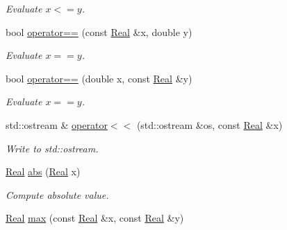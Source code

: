 \begin{DoxyCompactItemize}
\begin{DoxyCompactList}\small\item\em Evaluate $ x<=y $. \end{DoxyCompactList}\item 
\hypertarget{namespaceSpacy_aef4930427aac4c8089b4c43b1c97cf25}{}bool \hyperlink{namespaceSpacy_aef4930427aac4c8089b4c43b1c97cf25}{operator==} (const \hyperlink{classSpacy_1_1Real}{Real} \&x, double y)\label{namespaceSpacy_aef4930427aac4c8089b4c43b1c97cf25}

\begin{DoxyCompactList}\small\item\em Evaluate $ x==y $. \end{DoxyCompactList}\item 
\hypertarget{namespaceSpacy_a4703102a4db1dbffcce1cc5bd484a57c}{}bool \hyperlink{namespaceSpacy_a4703102a4db1dbffcce1cc5bd484a57c}{operator==} (double x, const \hyperlink{classSpacy_1_1Real}{Real} \&y)\label{namespaceSpacy_a4703102a4db1dbffcce1cc5bd484a57c}

\begin{DoxyCompactList}\small\item\em Evaluate $ x==y $. \end{DoxyCompactList}\item 
\hypertarget{namespaceSpacy_ace1cc9f68970644f58a760f77936a062}{}std\+::ostream \& \hyperlink{namespaceSpacy_ace1cc9f68970644f58a760f77936a062}{operator$<$$<$} (std\+::ostream \&os, const \hyperlink{classSpacy_1_1Real}{Real} \&x)\label{namespaceSpacy_ace1cc9f68970644f58a760f77936a062}

\begin{DoxyCompactList}\small\item\em Write to std\+::ostream. \end{DoxyCompactList}\item 
\hypertarget{namespaceSpacy_a89ed08f6f5a05e3f35afa37fcebf4b06}{}\hyperlink{classSpacy_1_1Real}{Real} \hyperlink{namespaceSpacy_a89ed08f6f5a05e3f35afa37fcebf4b06}{abs} (\hyperlink{classSpacy_1_1Real}{Real} x)\label{namespaceSpacy_a89ed08f6f5a05e3f35afa37fcebf4b06}

\begin{DoxyCompactList}\small\item\em Compute absolute value. \end{DoxyCompactList}\item 
\hypertarget{namespaceSpacy_aa662ae98b86b15b68de7d6ac8fc26696}{}\hyperlink{classSpacy_1_1Real}{Real} \hyperlink{namespaceSpacy_aa662ae98b86b15b68de7d6ac8fc26696}{max} (const \hyperlink{classSpacy_1_1Real}{Real} \&x, const \hyperlink{classSpacy_1_1Real}{Real} \&y)\label{namespaceSpacy_aa662ae98b86b15b68de7d6ac8fc26696}


\end{DoxyCompactItemize}
